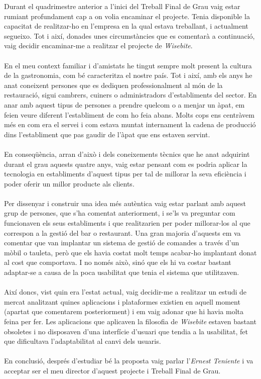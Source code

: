 Durant el quadrimestre anterior a l'inici del Treball Final de Grau vaig estar rumiant profundament cap a on volia encaminar el projecte. Tenia disponible la capacitat de realitzar-ho en l'empresa en la qual estava treballant, i actualment segueixo. Tot i així, donades unes circumstàncies que es comentarà a continuació, vaig decidir encaminar-me a realitzar el projecte de \textit{Wisebite}.
\\\\
En el meu context familiar i d'amistats he tingut sempre molt present la cultura de la gastronomia, com bé caracteritza el nostre país. Tot i així, amb els anys he anat coneixent persones que es dediquen professionalment al món de la restauració, sigui cambrers, cuiners o administradors d'establiments del sector. En anar amb aquest tipus de persones a prendre quelcom o a menjar un àpat, em feien veure diferent l'establiment de com ho feia abans. Molts cops ens centràvem més en com era el servei i com estava muntat internament la cadena de producció dins l'establiment que pas gaudir de l'àpat que ens estaven servint.
\\\\
En conseqüència, arran d'això i dels coneixements tècnics que he anat adquirint durant el grau aquests quatre anys, vaig estar pensant com es podria aplicar la tecnologia en establiments d'aquest tipus per tal de millorar la seva eficiència i poder oferir un millor producte als clients.
\\\\
Per dissenyar i construir una idea més autèntica vaig estar parlant amb aquest grup de persones, que s'ha comentat anteriorment, i se'ls va preguntar com funcionaven els seus establiments i que realitzarien per poder millorar-los al que correspon a la gestió del bar o restaurant. Una gran majoria d'aquests em va comentar que van implantar un sistema de gestió de comandes a través d'un mòbil o tauleta, però que els havia costat molt temps acabar-ho implantant donat al cost que comportava. I no només això, sinó que els hi va costar bastant adaptar-se a causa de la poca usabilitat que tenia el sistema que utilitzaven.
\\\\
\newpage
Així doncs, vist quin era l'estat actual, vaig decidir-me a realitzar un estudi de mercat analitzant quines aplicacions i plataformes existien en aquell moment (apartat que comentarem posteriorment) i em vaig adonar que hi havia molta feina per fer. Les aplicacions que aplicaven la filosofia de \textit{Wisebite} estaven bastant obsoletes i no disposaven d'una interfície d'usuari que tendia a la usabilitat, fet que dificultava l'adaptabilitat al canvi dels usuaris.
\\\\
En conclusió, després d'estudiar bé la proposta vaig parlar l'\textit{Ernest Teniente} i va acceptar ser el meu director d'aquest projecte i Treball Final de Grau.